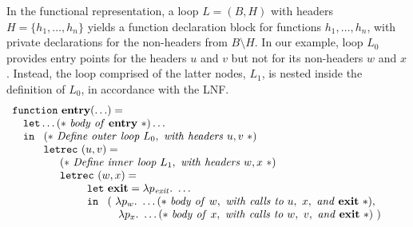  In the functional representation, a loop $L=(B,H)$ with headers
  $H=\{h_1,\ldots,h_n\}$ yields a function declaration block for
  functions $h_1,\ldots,h_n$, with private declarations for the
  non-headers from $B \setminus H$. In our example, loop $L_0$
  provides entry points for the headers $u$ and $v$ but not for its
  non-headers $w$ and $x$.  Instead, the loop comprised of the latter
  nodes, $L_1$, is nested inside the definition of $L_0$, in
  accordance with the LNF.
  \begin{equation}
    \label{FunctionalSteensgaard}
     \begin{array}{l}
       \mathtt{function}\ \entrynode (\ldots)=\\ 
       \quad \mathtt{let} \ldots (*\ \mathit{body\ of\ \entrynode}\ *)\ldots\\
       \quad \mathtt{in}\ 
         \begin{array}[t]{l}
           (*\ \mathit{Define\ outer\ loop}\ L_0,\ 
               \mathit{with\ headers}\ u, v\ *)\\
           \mathtt{letrec}\ (u,v) =\\
           \quad \begin{array}[t]{l}
                     (*\ \mathit{Define\ inner\ loop}\ L_1,\ 
                         \mathit{with\ headers}\ w, x\ *)\\
                     \mathtt{letrec}\ (w,x) =\\
                     \qquad 
                     \begin{array}{l}
                        \mathtt{let}\ \exitnode = 
                             \lambda p_{\mathit{exit}}.\ \ldots\\
                        \mathtt{in}\ 
                          \begin{array}[t]{l}
                          (%
                           \ \lambda p_w.\ \ldots (*\ \mathit{body\ of}\ w,\ 
                                            \mathit{with\ calls\ to}\ u,\ x,\
                                            \mathit{and}\ \exitnode\ *),\\ 
                           \ \ \ \lambda p_x.\ \ldots (*\ \mathit{body\ of}\ 
                                            x,\ \mathit{with\ calls\ to}\ w,\
                                            v,\ \mathit{and}\ \exitnode\ *)\ )
                           \end{array}\\

\end{array}
\end{array}
\end{array}
\end{array}
\end{equation}
